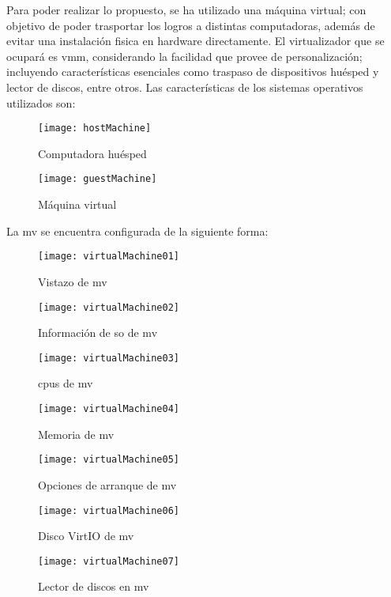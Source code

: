 \normalsize{ \indent
Para poder realizar lo propuesto, se ha utilizado una
máquina virtual; con objetivo de poder trasportar los
logros a distintas computadoras, además de evitar una
instalación fisica en hardware directamente. El
virtualizador que se ocupará es \acrshort{vmm},
considerando la facilidad que provee de personalización;
incluyendo características esenciales como traspaso de
dispositivos huésped y lector de discos, entre otros.
}
\newline
\normalsize{ \indent
Las características de los sistemas operativos
utilizados son:
}
\begin{figure}[!ht]
  \caption{Computadora huésped}
  \centering
  \texttt{[image: hostMachine]}
\end{figure}
\begin{figure}[!ht]
  \caption{Máquina virtual}
  \centering
  \texttt{[image: guestMachine]}
\end{figure}
\newline
\normalsize{ \indent
La \acrlong{mv} se encuentra configurada de la
siguiente forma:
}
\newpage
\begin{figure}[!ht]
  \caption{Vistazo de \acrshort{mv}}
  \centering
  \texttt{[image: virtualMachine01]}
\end{figure}
\begin{figure}[!ht]
  \caption{Información de \acrshort{so} de \acrshort{mv}}
  \centering
  \texttt{[image: virtualMachine02]}
\end{figure}
\newpage
\begin{figure}[!ht]
  \caption{\acrshort{cpu}s de \acrshort{mv}}
  \centering
  \texttt{[image: virtualMachine03]}
\end{figure}
\begin{figure}[!ht]
  \caption{Memoria de \acrshort{mv}}
  \centering
  \texttt{[image: virtualMachine04]}
\end{figure}
\newpage
\begin{figure}[!ht]
  \caption{Opciones de arranque de \acrshort{mv}}
  \centering
  \texttt{[image: virtualMachine05]}
\end{figure}
\begin{figure}[!ht]
  \caption{Disco VirtIO de \acrshort{mv}}
  \centering
  \texttt{[image: virtualMachine06]}
\end{figure}
\newpage
\begin{figure}[!ht]
  \caption{Lector de discos en \acrshort{mv}}
  \centering
  \texttt{[image: virtualMachine07]}
\end{figure}
